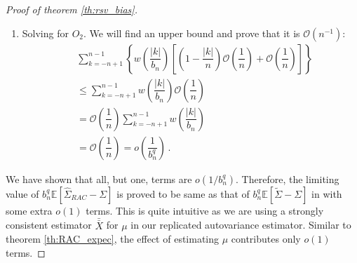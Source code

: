 \documentclass[12pt]{article}
\theoremstyle{remark}
\begin{document}
\begin{proof}[Proof of theorem \ref{th:rsv_bias}]
\begin{enumerate}
 \item Solving for $O_2$. We will find an upper bound and prove that it is $\mathcal{O}\left(n^{-1}\right)$:
 \begin{align*}
     & \sum_{k=-n+1}^{n-1}\left\{w\left(\dfrac{|k|}{b_n}\right)\left[\left(1-\dfrac{|k|}{n}\right)\mathcal{O}\left(\dfrac{1}{n}\right) + \mathcal{O}\left(\dfrac{1}{n}\right) \right] \right\} \\
     &\leq \sum_{k=-n+1}^{n-1}w\left(\dfrac{|k|}{b_n}\right)\mathcal{O}\left(\dfrac{1}{n}\right)\\
     &= \mathcal{O}\left(\dfrac{1}{n}\right) \sum_{k=-n+1}^{n-1}w\left(\dfrac{|k|}{b_n}\right) \\
     &= \mathcal{O}\left(\dfrac{1}{n}\right) = o\left(\dfrac{1}{b_n^q}\right) \,.
 \end{align*}
 \end{enumerate}  
%
 We have shown that all, but one, terms are $o(1/b_n^q)$. Therefore, the limiting value of $b_n^q\mathbb{E}[\hat{\Sigma}_{RAC} - \Sigma]$ is proved to be same as that of $b_n^q\mathbb{E}[\tilde{\Sigma} - \Sigma]$ in \cite{hannan2009multiple} with some extra $o(1)$ terms. This is quite intuitive as we are using a strongly consistent estimator $\bar{\bar{X}}$ for $\mu$ in our replicated autovariance estimator. Similar to theorem \ref{th:RAC_expec}, the effect of estimating $\mu$ contributes only $o(1)$ terms. 
\end{proof}
\end{document}
